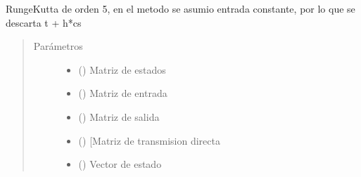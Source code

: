 \documentclass[letterpaper,10pt,spanish]{sphinxmanual}
\begin{document}
\begin{fulllineitems}
\label{\detokenize{codigos/rk_generator:rk_generator.runge_kutta5}}
Runge\sphinxhyphen{}Kutta de orden 5, en el metodo se asumio entrada constante, por lo que se descarta t + h*cs
\begin{quote}\begin{description}
\item[{Parámetros}] \leavevmode\begin{itemize}
\item {} 
 (\sphinxstyleliteralemphasis{\sphinxupquote{, }}\sphinxstyleliteralemphasis{\sphinxupquote{, }}) \textendash{} Matriz de estados

\item {} 
 (\sphinxstyleliteralemphasis{\sphinxupquote{, }}\sphinxstyleliteralemphasis{\sphinxupquote{, }}) \textendash{} Matriz de entrada

\item {} 
 (\sphinxstyleliteralemphasis{\sphinxupquote{, }}\sphinxstyleliteralemphasis{\sphinxupquote{, }}) \textendash{} Matriz de salida

\item {} 
 (\sphinxstyleliteralemphasis{\sphinxupquote{, }}\sphinxstyleliteralemphasis{\sphinxupquote{, }}) \textendash{} {[}Matriz de transmision directa

\item {} 
 (\sphinxstyleliteralemphasis{\sphinxupquote{, }}\sphinxstyleliteralemphasis{\sphinxupquote{, }}) \textendash{} Vector de estado


\end{itemize}
\end{description}
\end{quote}
\end{fulllineitems}
\end{document}
